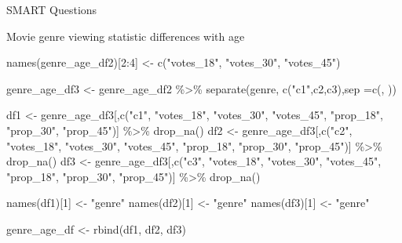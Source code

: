 \documentclass[
  ignorenonframetext,
]{beamer}
\newenvironment{Shaded}{\begin{snugshade}}{\end{snugshade}}
\newcommand{\AttributeTok}[1]{\textcolor[rgb]{0.77,0.63,0.00}{#1}}
\newcommand{\DecValTok}[1]{\textcolor[rgb]{0.00,0.00,0.81}{#1}}
\newcommand{\FunctionTok}[1]{\textcolor[rgb]{0.00,0.00,0.00}{#1}}
\newcommand{\NormalTok}[1]{#1}
\newcommand{\OtherTok}[1]{\textcolor[rgb]{0.56,0.35,0.01}{#1}}
\newcommand{\SpecialCharTok}[1]{\textcolor[rgb]{0.00,0.00,0.00}{#1}}
\newcommand{\StringTok}[1]{\textcolor[rgb]{0.31,0.60,0.02}{#1}}
\begin{document}
\begin{frame}[fragile]{SMART Questions}
\begin{block}{Movie genre viewing statistic differences with age}
\begin{Shaded}
\begin{Highlighting}[]
\FunctionTok{names}\NormalTok{(genre\_age\_df2)[}\DecValTok{2}\SpecialCharTok{:}\DecValTok{4}\NormalTok{] }\OtherTok{\textless{}{-}} \FunctionTok{c}\NormalTok{(}\StringTok{"votes\_18"}\NormalTok{, }\StringTok{"votes\_30"}\NormalTok{, }\StringTok{"votes\_45"}\NormalTok{)}

\NormalTok{genre\_age\_df3 }\OtherTok{\textless{}{-}}\NormalTok{ genre\_age\_df2 }\SpecialCharTok{\%\textgreater{}\%}
  \FunctionTok{separate}\NormalTok{(genre, }\FunctionTok{c}\NormalTok{(}\StringTok{"c1"}\NormalTok{,}\StringTok{\textquotesingle{}c2\textquotesingle{}}\NormalTok{,}\StringTok{\textquotesingle{}c3\textquotesingle{}}\NormalTok{),}\AttributeTok{sep =}\FunctionTok{c}\NormalTok{(}\StringTok{\textquotesingle{}, \textquotesingle{}}\NormalTok{))}

\NormalTok{df1 }\OtherTok{\textless{}{-}}\NormalTok{ genre\_age\_df3[,}\FunctionTok{c}\NormalTok{(}\StringTok{"c1"}\NormalTok{, }\StringTok{"votes\_18"}\NormalTok{, }\StringTok{"votes\_30"}\NormalTok{, }\StringTok{"votes\_45"}\NormalTok{, }\StringTok{"prop\_18"}\NormalTok{, }\StringTok{"prop\_30"}\NormalTok{, }\StringTok{"prop\_45"}\NormalTok{)] }\SpecialCharTok{\%\textgreater{}\%} \FunctionTok{drop\_na}\NormalTok{()}
\NormalTok{df2 }\OtherTok{\textless{}{-}}\NormalTok{ genre\_age\_df3[,}\FunctionTok{c}\NormalTok{(}\StringTok{"c2"}\NormalTok{, }\StringTok{"votes\_18"}\NormalTok{, }\StringTok{"votes\_30"}\NormalTok{, }\StringTok{"votes\_45"}\NormalTok{, }\StringTok{"prop\_18"}\NormalTok{, }\StringTok{"prop\_30"}\NormalTok{, }\StringTok{"prop\_45"}\NormalTok{)] }\SpecialCharTok{\%\textgreater{}\%} \FunctionTok{drop\_na}\NormalTok{()}
\NormalTok{df3 }\OtherTok{\textless{}{-}}\NormalTok{ genre\_age\_df3[,}\FunctionTok{c}\NormalTok{(}\StringTok{"c3"}\NormalTok{, }\StringTok{"votes\_18"}\NormalTok{, }\StringTok{"votes\_30"}\NormalTok{, }\StringTok{"votes\_45"}\NormalTok{, }\StringTok{"prop\_18"}\NormalTok{, }\StringTok{"prop\_30"}\NormalTok{, }\StringTok{"prop\_45"}\NormalTok{)] }\SpecialCharTok{\%\textgreater{}\%} \FunctionTok{drop\_na}\NormalTok{()}

\FunctionTok{names}\NormalTok{(df1)[}\DecValTok{1}\NormalTok{] }\OtherTok{\textless{}{-}} \StringTok{"genre"}
\FunctionTok{names}\NormalTok{(df2)[}\DecValTok{1}\NormalTok{] }\OtherTok{\textless{}{-}} \StringTok{"genre"}
\FunctionTok{names}\NormalTok{(df3)[}\DecValTok{1}\NormalTok{] }\OtherTok{\textless{}{-}} \StringTok{"genre"}

\NormalTok{genre\_age\_df }\OtherTok{\textless{}{-}} \FunctionTok{rbind}\NormalTok{(df1, df2, df3)}
\end{Highlighting}
\end{Shaded}


\end{block}
\end{frame}
\end{document}
